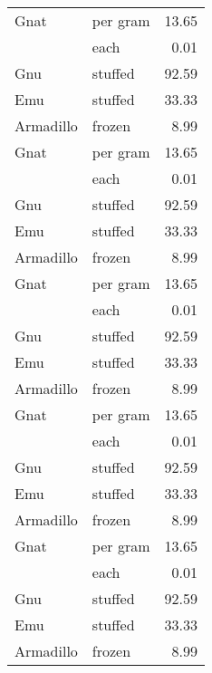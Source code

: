 {\begin{center}
\begin{xtabular}{|l|l|r|}
Gnat      & per gram & 13.65 \\
          & each     & 0.01  \\
Gnu       & stuffed  & 92.59 \\
Emu       & stuffed  & 33.33 \\
Armadillo & frozen   & 8.99  \\
Gnat      & per gram & 13.65 \\
          & each     & 0.01  \\
Gnu       & stuffed  & 92.59 \\
Emu       & stuffed  & 33.33 \\
Armadillo & frozen   & 8.99  \\
Gnat      & per gram & 13.65 \\
          & each     & 0.01  \\
Gnu       & stuffed  & 92.59 \\
Emu       & stuffed  & 33.33 \\
Armadillo & frozen   & 8.99  \\
Gnat      & per gram & 13.65 \\
          & each     & 0.01  \\
Gnu       & stuffed  & 92.59 \\
Emu       & stuffed  & 33.33 \\
Armadillo & frozen   & 8.99  \\
Gnat      & per gram & 13.65 \\
          & each     & 0.01  \\
Gnu       & stuffed  & 92.59 \\
Emu       & stuffed  & 33.33 \\
Armadillo & frozen   & 8.99  \\
\hline
\end{xtabular}
\end{center}
} 
